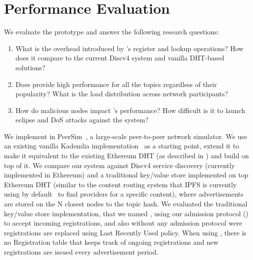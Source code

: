 
\section{Performance Evaluation}
\label{sec:eval}

We evaluate the \sysname prototype and answer the following research questions:
\begin{enumerate}
    \item What is the overhead introduced by \sysname's register and lookup operations? How does it compare to the current Discv4 system and vanilla DHT-based solutions?
    \item Does \sysname provide high performance for all the topics regardless of their popularity? What is the load distribution across network participants?
    \item How do malicious nodes impact \sysname’s performance? How difficult is it to launch eclipse and DoS attacks against the system?
\end{enumerate}

 We implement \sysname in PeerSim~\cite{p2p09-peersim}, a large-scale peer-to-peer network simulator. We use an existing vanilla Kademlia implementation~\cite{peersim_kademlia} as a starting point, extend it to make it equivalent to the existing Ethereum DHT (as described in ) and build \sysname on top of it. 
We compare our system against Discv4 service discovery (currently implemented in Ethereum) and a traditional key/value store implemented on top Ethereum DHT (similar to the content routing system that IPFS is currently using by default~\cite{libp2p_kaddht} to find providers for a specific content),  where advertisements are stored on the N closest nodes to the topic hash.  
We evaluated the traditional key/value store implementation, that we named \altname, using our admission protocol () to accept incoming registrations, and also without any admission protocol were registrations are replaced using  Last Recently Used policy.
When using \altname, there is no Registration table that keeps track of ongoing registrations and new registrations are issued every advertisement period.

